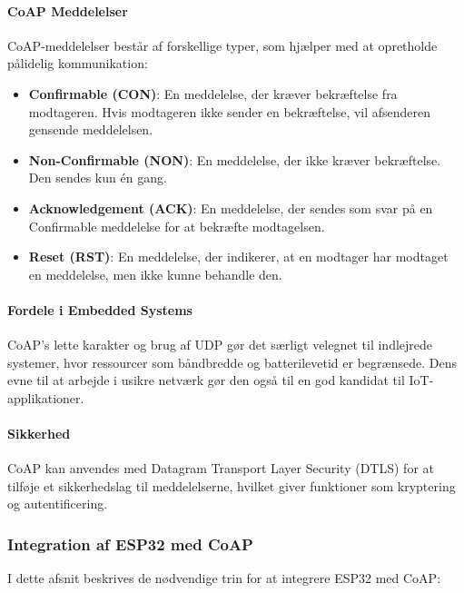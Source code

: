 \documentclass[12pt,a4paper]{book}
\begin{document}
	\paragraph{CoAP Meddelelser}
	CoAP-meddelelser består af forskellige typer, som hjælper med at opretholde pålidelig kommunikation:
	\begin{itemize}
		\item \textbf{Confirmable (CON)}: En meddelelse, der kræver bekræftelse fra modtageren. Hvis modtageren ikke sender en bekræftelse, vil afsenderen gensende meddelelsen.
		\item \textbf{Non-Confirmable (NON)}: En meddelelse, der ikke kræver bekræftelse. Den sendes kun én gang.
		\item \textbf{Acknowledgement (ACK)}: En meddelelse, der sendes som svar på en Confirmable meddelelse for at bekræfte modtagelsen.
		\item \textbf{Reset (RST)}: En meddelelse, der indikerer, at en modtager har modtaget en meddelelse, men ikke kunne behandle den.
	\end{itemize}
	
	\paragraph{Fordele i Embedded Systems}
	CoAP's lette karakter og brug af UDP gør det særligt velegnet til indlejrede systemer, hvor ressourcer som båndbredde og batterilevetid er begrænsede. Dens evne til at arbejde i usikre netværk gør den også til en god kandidat til IoT-applikationer.
	
	\paragraph{Sikkerhed}
	CoAP kan anvendes med Datagram Transport Layer Security (DTLS) for at tilføje et sikkerhedslag til meddelelserne, hvilket giver funktioner som kryptering og autentificering.
	
	\subsubsection{Integration af ESP32 med CoAP}
	I dette afsnit beskrives de nødvendige trin for at integrere ESP32 med CoAP:
	
\end{document}
